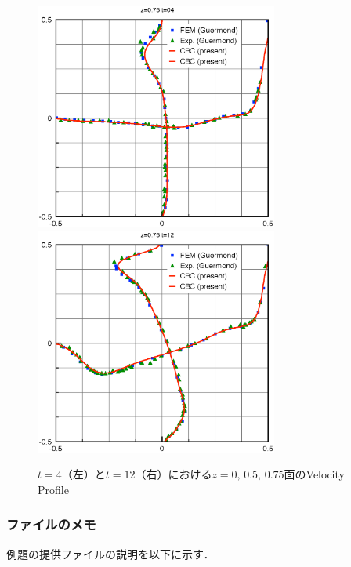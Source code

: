 \begin{figure}[htdp]
\begin{minipage}{16cm}
\end{minipage}
\begin{minipage}{16cm}
\includegraphics[width=8cm]{z75t04.eps}
\includegraphics[width=8cm]{z75t12.eps}
\end{minipage}
\caption{$t=4$（左）と$t=12$（右）における$z=0, \, 0.5, \, 0.75$面のVelocity Profile}
\label{fig:VP}
\end{figure}

\subsubsection{ファイルのメモ}
例題の提供ファイルの説明を以下に示す．\\
\vspace{3mm}

